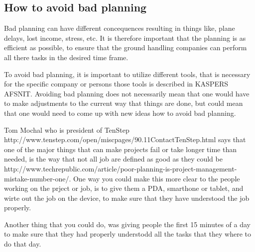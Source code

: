 \subsection{How to avoid bad planning}

Bad planning can have different concequences resulting in things like, plane delays, lost income, stress, etc. It is therefore important that the planning is as efficient as possible, to ensure that the ground handling companies can perform all there tasks in the desired time frame.

To avoid bad planning, it is important to utilize different tools, that is necessary for the specific company or persons those tools is described in KASPERS AFSNIT. Avoiding bad planning does not necessarily mean that one would have to make adjustments to the current way that things are done, but could mean that one would need to come up with new ideas how to avoid bad planning.

Tom Mochal who is president of TenStep http://www.tenstep.com/open/miscpages/90.11ContactTenStep.html says that one of the major things that can make projects fail or take longer time than needed, is the way that not all job are defined as good as they could be http://www.techrepublic.com/article/poor-planning-is-project-management-mistake-number-one/. One way you could make this more clear to the people working on the prject or job, is to give them a PDA, smarthone or tablet, and wirte out the job on the device, to make sure that they have understood the job properly.

Another thing that you could do, was giving people the first 15 minutes of a day to make sure that they had properly understodd all the tasks that they where to do that day.